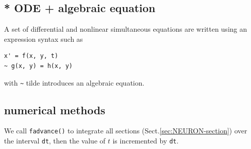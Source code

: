 \subsection{* ODE + algebraic equation}

A set of differential and nonlinear simultaneous equations are written using an
expression syntax such as
\begin{verbatim}
x' = f(x, y, t)
~ g(x, y) = h(x, y)
\end{verbatim}
with \verb!~! tilde introduces an algebraic equation.

\subsection{numerical methods}
\label{sec:NEURON-solver}

We call \verb!fadvance()! to integrate all sections
(Sect.\ref{sec:NEURON-section}) over the interval \verb!dt!, then the value of $t$ is
incremented by \verb!dt!. 


